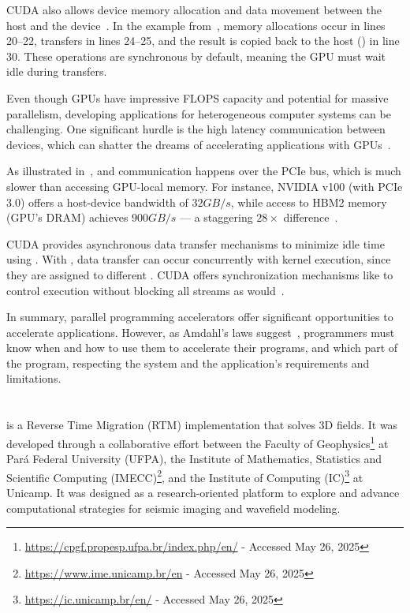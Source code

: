 \documentclass[Ingles]{ic-tese-v3}
\begin{document}
CUDA also allows device memory allocation and data movement between the host and the device~\cite{cuda}. In the example from~, memory allocations occur in lines 20–22, \htd transfers in lines 24–25, and the result is copied back to the host (\dth) in line 30. These operations are synchronous by default, meaning the GPU must wait idle during transfers.

Even though GPUs have impressive FLOPS capacity and potential for massive parallelism, developing applications for heterogeneous computer systems can be challenging. One significant hurdle is the high latency communication between devices, which can shatter the dreams of accelerating applications with GPUs~\cite{kirk,cuda,liu2012}. 

As illustrated in~, \dth and \htd communication happens over the PCIe bus\cite{kirk}, which is much slower than accessing GPU-local memory. For instance, NVIDIA v100 (with PCIe 3.0) offers a host-device bandwidth of $32 GB/s$, while access to HBM2 memory (GPU's DRAM) achieves $900 GB/s$ --- a staggering $28\times$ difference~\cite{v100}.

CUDA provides asynchronous data transfer mechanisms to minimize idle time using . With , data transfer can occur concurrently with kernel execution, since they are assigned to different . CUDA offers synchronization mechanisms like  to control execution without blocking all streams as  would~\cite{kirk,cuda}.

In summary, parallel programming accelerators offer significant opportunities to accelerate applications. However, as Amdahl's laws suggest~\cite{hennessy}, programmers must know when and how to use them to accelerate their programs, and which part of the program, respecting the system and the application's requirements and limitations.

\section{\awave}
\label{sec:awave3d}

\awave is a Reverse Time Migration (RTM) implementation that solves 3D fields. It was developed through a collaborative effort between the Faculty of Geophysics\footnote{\url{https://cpgf.propesp.ufpa.br/index.php/en/} - Accessed May 26, 2025} at Pará Federal University (UFPA), the Institute of Mathematics, Statistics and Scientific Computing (IMECC)\footnote{\url{https://www.ime.unicamp.br/en} - Accessed May 26, 2025}, and the Institute of Computing (IC)\footnote{\url{https://ic.unicamp.br/en/} - Accessed May 26, 2025} at Unicamp. It was designed as a research-oriented platform to explore and advance computational strategies for seismic imaging and wavefield modeling.
\end{document}
